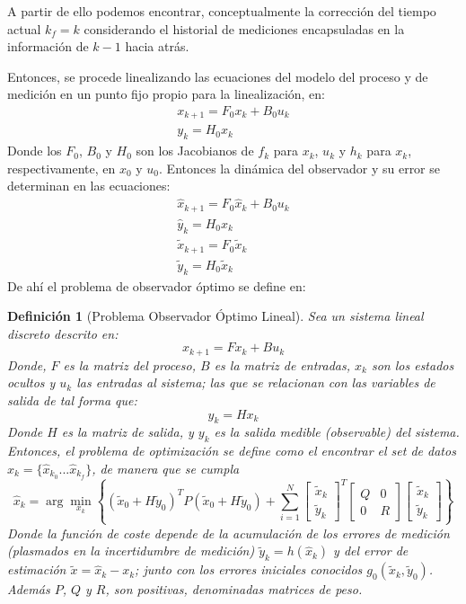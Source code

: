 \documentclass[10pt]{report}
\numberwithin{equation}{chapter}
\numberwithin{algorithm}{chapter}
\newtheorem {defin}{Definición}[section]
\begin{document}
A partir de ello podemos encontrar, conceptualmente la corrección del tiempo actual $k_f=k$ considerando el historial de mediciones encapsuladas en la información de $k-1$ hacia atrás.\par
Entonces, se procede linealizando las ecuaciones del modelo del proceso y de medición en un punto fijo propio para la linealización, en:
\begin{gather}
x_{k+1}=F_0x_k+B_0u_k\\
y_{k}=H_0x_k\label{chap2:MedicionLineal}
\end{gather}
Donde los $F_0$, $B_0$ y $H_0$ son los Jacobianos de $f_k$ para $x_k$, $u_k$ y $h_k$ para $x_k$, respectivamente, en $x_0$ y $u_0$. Entonces la dinámica del observador y su error se determinan en las ecuaciones:
\begin{gather}
\hat{x}_{k+1}=F_0\hat{x}_k+B_0u_k\\
\hat{y}_{k}=H_0\hat{x}_k\\
\tilde{x}_{k+1}=F_0\tilde{x}_k\\
\tilde{y}_{k}=H_0\tilde{x}_k
\end{gather}
De ahí el problema de observador óptimo se define en:
\begin{defin}[Problema Observador Óptimo Lineal]\label{problemaobsoptlineal}
Sea un sistema lineal discreto descrito en:
\begin{equation}
\label{filtro_ecc3}
x_{k+1}=Fx_k+Bu_k
\end{equation} 
Donde, $F$ es la matriz del proceso, $B$ es la matriz de entradas, $x_k$ son los estados ocultos y $u_k$ las entradas al sistema; las que se relacionan con las variables de salida de tal forma que:
\begin{equation}
\label{filtro_ecc4}
y_{k}=Hx_k
\end{equation} 
Donde $H$ es la matriz de salida, y $y_k$ es la salida medible (observable) del sistema.
Entonces, el problema de optimización se define como el encontrar el set de datos $\hat{x}_k=\{\hat{x}_{k_0}...\hat{x}_{k_f}\}$, de manera que se cumpla $$\hat{x}_k=\arg\min_{x_k}\left\{(\tilde{x}_0+H\tilde{y}_0)^T
P(\tilde{x}_0+H\tilde{y}_0)+ \sum_{i=1}^{N} \begin{bmatrix}\tilde{x}_k\\\tilde{y}_k\end{bmatrix}^T
\begin{bmatrix}Q&0\\0&R\end{bmatrix} \begin{bmatrix}\tilde{x}_k\\\tilde{y}_k\end{bmatrix} \right\}$$
Donde la función de coste depende de la acumulación de los errores de medición (plasmados en la incertidumbre de medición) $\tilde{y}_k=h(\hat{x}_k)$ y del error de estimación $\tilde{x}=\hat{x}_k-x_k$; junto con los errores iniciales conocidos $g_0(\tilde{x}_k,\tilde{y}_0)$. Además $P$, $Q$ y $R$, son positivas, denominadas matrices de peso.
\end{defin}
\end{document}
